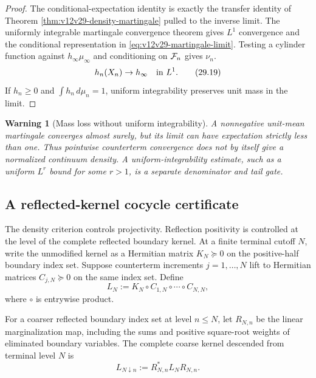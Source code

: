 \documentclass[11pt]{article}
\newtheorem{warning}[theorem]{Warning}
\theoremstyle{remark}
\begin{document}
\begin{proof}
The conditional-expectation identity is exactly the transfer identity
of Theorem \ref{thm:v12v29-density-martingale} pulled to the inverse
limit.  The uniformly integrable martingale convergence theorem gives
\(L^1\) convergence and the conditional representation in
\eqref{eq:v12v29-martingale-limit}.  Testing a cylinder function
against \(h_\infty\mu_\infty\) and conditioning on \({\cal F}_n\)
gives \(\nu_n\).
\begin{equation}
 h_n(X_n)\to h_\infty\quad\hbox{in }L^1.
                                                        \tag{29.19}
 \label{eq:v12v29-martingale-limit}
\end{equation}
If \(h_n\ge0\) and \(\int h_n\,d\mu_n=1\), uniform integrability
preserves unit mass in the limit.
\end{proof}

\begin{warning}[Mass loss without uniform integrability]
\label{warn:v12v29-mass-loss}
A nonnegative unit-mean martingale converges almost surely, but its
limit can have expectation strictly less than one.  Thus pointwise
counterterm convergence does not by itself give a normalized
continuum density.  A uniform-integrability estimate, such as a
uniform \(L^r\) bound for some \(r>1\), is a separate denominator and
tail gate.
\end{warning}

\subsection{A reflected-kernel cocycle certificate}

The density criterion controls projectivity.  Reflection positivity
is controlled at the level of the complete reflected boundary
kernel.  At a finite terminal cutoff \(N\), write the unmodified
kernel as a Hermitian matrix \(K_N\succeq0\) on the positive-half
boundary index set.  Suppose counterterm increments \(j=1,\ldots,N\)
lift to Hermitian matrices \(C_{j,N}\succeq0\) on the same index set.
Define
\begin{equation}
 L_N
 :=
 K_N\circ C_{1,N}\circ\cdots\circ C_{N,N},       \tag{29.20}
\end{equation}
where \(\circ\) is entrywise product.

For a coarser reflected boundary index set at level \(n\le N\), let
\(R_{N,n}\) be the linear marginalization map, including the sums and
positive square-root weights of eliminated boundary variables.  The
complete coarse kernel descended from terminal level \(N\) is
\begin{equation}
 L_{N\downarrow n}:=R_{N,n}^*L_NR_{N,n}.         \tag{29.21}
\end{equation}
\end{document}
